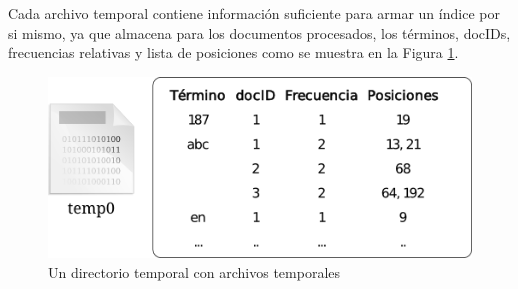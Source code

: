 Cada archivo temporal contiene información suficiente para armar un índice por si mismo, ya que almacena para los documentos procesados, los términos, docIDs, frecuencias relativas y lista de posiciones como se muestra en la Figura \ref{fig:tempfile}.


\begin{figure}[!h]
\centering
    \includegraphics[scale=0.9]{./Images/tempFileEstr.png}
\caption{Un directorio temporal con archivos temporales}
\label{fig:tempfile}
\end{figure}


